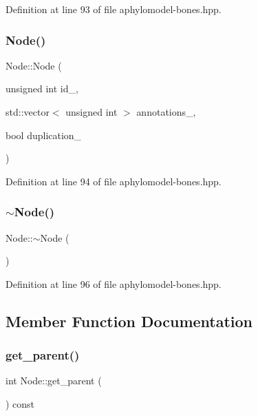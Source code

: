 Definition at line 93 of file aphylomodel-\/bones.\+hpp.

\mbox{\label{class_node_a05edab5d06fba5a71443399343645553}} 
\subsubsection{\texorpdfstring{Node()}{Node()}\hspace{0.1cm}{\footnotesize\ttfamily [3/3]}}
{\footnotesize\ttfamily Node\+::\+Node (\begin{DoxyParamCaption}\item[{unsigned int}]{id\+\_\+,  }\item[{std\+::vector$<$ unsigned int $>$}]{annotations\+\_\+,  }\item[{bool}]{duplication\+\_\+ }\end{DoxyParamCaption})\hspace{0.3cm}{\ttfamily [inline]}}



Definition at line 94 of file aphylomodel-\/bones.\+hpp.

\mbox{\label{class_node_aa0840c3cb5c7159be6d992adecd2097c}} 
\subsubsection{\texorpdfstring{$\sim$\+Node()}{~Node()}}
{\footnotesize\ttfamily Node\+::$\sim$\+Node (\begin{DoxyParamCaption}{ }\end{DoxyParamCaption})\hspace{0.3cm}{\ttfamily [inline]}}



Definition at line 96 of file aphylomodel-\/bones.\+hpp.



\subsection{Member Function Documentation}
\mbox{\label{class_node_a661cb63a33e950b84c9c093c63d1ab63}} 
\subsubsection{\texorpdfstring{get\+\_\+parent()}{get\_parent()}}
{\footnotesize\ttfamily int Node\+::get\+\_\+parent (\begin{DoxyParamCaption}{ }\end{DoxyParamCaption}) const\hspace{0.3cm}{\ttfamily [inline]}}



